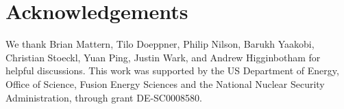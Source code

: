 \section*{Acknowledgements}

We thank Brian Mattern, Tilo Doeppner, Philip Nilson, Barukh Yaakobi,
Christian Stoeckl, Yuan Ping, Justin Wark, and Andrew Higginbotham for
helpful discussions. This work was supported by the US Department of
Energy, Office of Science, Fusion Energy Sciences and the National
Nuclear Security Administration, through grant DE-SC0008580.\textbf{\\}


%
%
%
%
%
%
%
%
%
%
%
%
%
%
%
%
%
%
